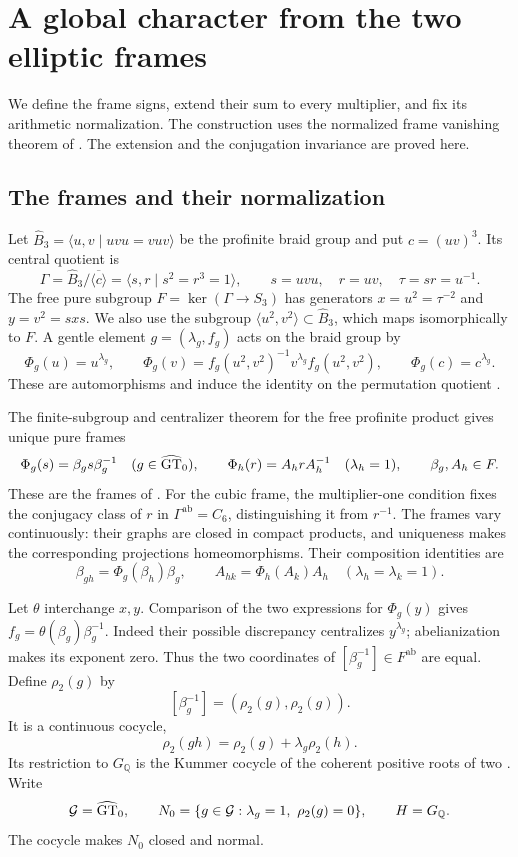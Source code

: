 \section{A global character from the two elliptic frames}
\label{sec:global-frame-character}

We define the frame signs, extend their sum to every multiplier, and
fix its arithmetic normalization. The construction uses the normalized
frame vanishing theorem of \cite[Theorem~3]{H17}. The extension and
the conjugation invariance are proved here.

\subsection{The frames and their normalization}

Let $\widehat B_3=\langle u,v\mid uvu=vuv\rangle$ be the profinite
braid group and put $c=(uv)^3$. Its central quotient is
\[
 \Gamma=\widehat B_3/\overline{\langle c\rangle}
      =\langle s,r\mid s^2=r^3=1\rangle,
 \qquad s=uvu,\quad r=uv,\quad \tau=sr=u^{-1}.
\]
The free pure subgroup $F=\ker(\Gamma\to S_3)$ has generators
$x=u^2=\tau^{-2}$ and $y=v^2=sxs$. We also use the subgroup
$\langle u^2,v^2\rangle\subset\widehat B_3$, which maps isomorphically
to $F$. A gentle element $g=(\lambda_g,f_g)$ acts on the braid
group by
\[
 \Phi_g(u)=u^{\lambda_g},\qquad
 \Phi_g(v)=f_g(u^2,v^2)^{-1}v^{\lambda_g}f_g(u^2,v^2),
 \qquad \Phi_g(c)=c^{\lambda_g}.
\]
These are automorphisms and induce the identity on the permutation
quotient \cite[Section 3, before Lemma~5]{H17}.

The finite-subgroup and centralizer theorem for the free profinite
product gives unique pure frames
\[
 \Phi_g(s)=\beta_gs\beta_g^{-1}\quad(g\in\widehat{\mathrm{GT}}_0),
 \qquad
 \Phi_h(r)=A_hrA_h^{-1}\quad(\lambda_h=1),
 \qquad \beta_g,A_h\in F.
\]
These are the frames of \cite[Lemma~5]{H17}. For the cubic frame,
the multiplier-one condition fixes the conjugacy class of $r$ in
$\Gamma^{\mathrm{ab}}=C_6$, distinguishing it from $r^{-1}$.
The frames vary continuously: their graphs are closed in compact
products, and uniqueness makes the corresponding projections
homeomorphisms. Their composition identities are
\begin{equation}
 \beta_{gh}=\Phi_g(\beta_h)\beta_g,
 \qquad A_{hk}=\Phi_h(A_k)A_h
       \quad(\lambda_h=\lambda_k=1).
 \label{eq:frame-cocycles}
\end{equation}

Let $\theta$ interchange $x,y$. Comparison of the two expressions
for $\Phi_g(y)$ gives
$f_g=\theta(\beta_g)\beta_g^{-1}$. Indeed their possible discrepancy
centralizes $y^{\lambda_g}$; abelianization makes its exponent zero.
Thus the two coordinates of $[\beta_g^{-1}]\in F^{\mathrm{ab}}$
are equal. Define $\rho_2(g)$ by
\[
 [\beta_g^{-1}]=(\rho_2(g),\rho_2(g)).
\]
It is a continuous cocycle,
\[
 \rho_2(gh)=\rho_2(g)+\lambda_g\rho_2(h).
\]
Its restriction to $G_{\mathbb Q}$ is the Kummer cocycle of the
coherent positive roots of two \cite[Lemma~7]{H17}.
Write
\[
 \mathcal G=\widehat{\mathrm{GT}}_0,\qquad
 N_0=\{g\in\mathcal G:\lambda_g=1,\ \rho_2(g)=0\},
 \qquad H=G_{\mathbb Q}.
\]
The cocycle makes $N_0$ closed and normal.

